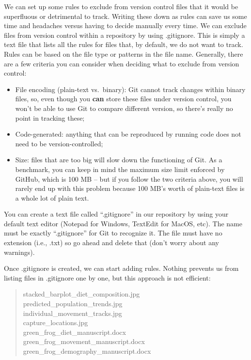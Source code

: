 \documentclass[
]{book}
\providecommand{\tightlist}{%
  \setlength{\itemsep}{0pt}\setlength{\parskip}{0pt}}
\begin{document}
We can set up some rules to exclude from version control files that it would be superfluous or detrimental to track. Writing these down as rules can save us some time and headaches versus having to decide manually every time. We can exclude files from version control within a repository by using .gitignore. This is simply a text file that lists all the rules for files that, by default, we do not want to track. Rules can be based on the file type or patterns in the file name. Generally, there are a few criteria you can consider when deciding what to exclude from version control:

\begin{itemize}
\tightlist
\item
  File encoding (plain-text vs.~binary): Git cannot track changes within binary files, so, even though you \textbf{can} store these files under version control, you won't be able to use Git to compare different version, so there's really no point in tracking these;
\item
  Code-generated: anything that can be reproduced by running code does not need to be version-controlled;
\item
  Size: files that are too big will slow down the functioning of Git. As a benchmark, you can keep in mind the maximum size limit enforced by GitHub, which is 100 MB -- but if you follow the two criteria above, you will rarely end up with this problem because 100 MB's worth of plain-text files is a whole lot of plain text.
\end{itemize}

You can create a text file called ``.gitignore'' in our repository by using your default text editor (Notepad for Windows, TextEdit for MacOS, etc). The name must be exactly ``.gitignore'' for Git to recognize it. The file must have no extension (i.e., .txt) so go ahead and delete that (don't worry about any warnings).

Once .gitignore is created, we can start adding rules. Nothing prevents us from listing files in .gitignore one by one, but this approach is not efficient:

\begin{quote}
stacked\_barplot\_diet\_composition.jpg\\
predicted\_population\_trends.jpg\\
individual\_movement\_tracks.jpg\\
capture\_locations.jpg\\
green\_frog\_diet\_manuscript.docx\\
green\_frog\_movement\_manuscript.docx\\
green\_frog\_demography\_manuscript.docx
\end{quote}
\end{document}
